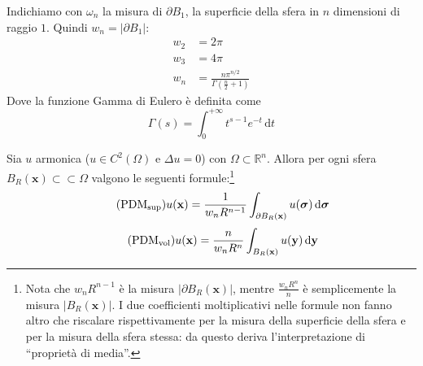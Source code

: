 \documentclass[10pt,a4paper,twoside,openright]{book}
\newcommand{\x}{\mathbf{x}}
\newcommand{\y}{\mathbf{y}}
\newcommand{\sigg}{\bm{\sigma}}
\newcommand{\de}{\,\mathrm d}
\newcommand{\dt}{\de t}
\newcommand{\dyy}{\de \y}
\newcommand{\dsig}{\de \sigg}
\begin{document}
Indichiamo con $\omega _{n}$ la misura di $\partial B_{1}$, la superficie della sfera in $n$ dimensioni di raggio $1$. Quindi $w_{n} =| \partial B_{1}| $:
\begin{align*}
	w_{2} & =2\pi                                                   \\
	w_{3} & =4\pi                                                   \\
	w_{n} & =\frac{n\pi ^{n/2}}{\Gamma \left(\frac{n}{2} +1\right)} 
\end{align*}
Dove la funzione Gamma di Eulero è definita come
\begin{equation*}
	\Gamma (s) =\int ^{+\infty }_{0} t^{s-1} e^{-t} \dt
\end{equation*}
\begin{theorem}
\label{thm:armonica-allora-pdm}
	Sia $u$ armonica ($u\in C^{2}(\Omega)$ e $\Delta u=0$) con $\Omega \subset \mathbb{R}^{n}$. Allora per ogni sfera $B_{R}(\x) \subset \subset \Omega $ valgono le seguenti formule:\footnote{Nota che $w_{n} R^{n-1}$ è la misura $| \partial B_{R}(\x)| $, mentre $\frac{w_{n} R^{n}}{n}$ è semplicemente la misura $| B_{R}(\x)| $. I due coefficienti moltiplicativi nelle formule non fanno altro che riscalare rispettivamente per la misura della superficie della sfera e per la misura della sfera stessa: da questo deriva l'interpretazione di ``proprietà di media''.}
	\begin{equation}
		\tag{PDM$_{\text{sup}}$}
		u(\x) =\frac{1}{w_{n} R^{n-1}}\int _{\partial B_{R}(\x)} u(\sigg) \dsig 
		\label{eq:lap-prop-media-sup}
	\end{equation}
	\begin{equation}
		\tag{PDM$_{\text{vol}}$}
		u(\x) =\frac{n}{w_{n} R^{n}}\int _{B_{R}(\x)} u(\y) \dyy
		\label{eq:lap-prop-media-vol}
	\end{equation}
\end{theorem}
\end{document}
